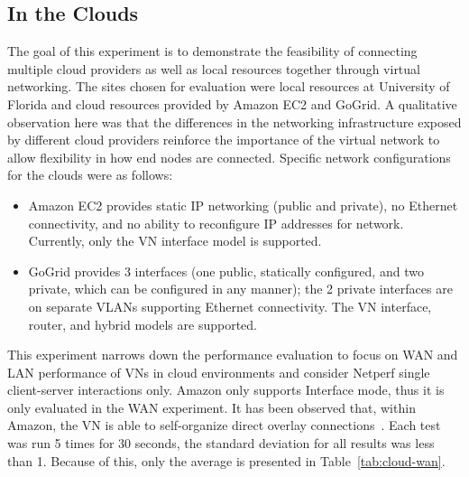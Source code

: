 \subsection{In the Clouds}

The goal of this experiment is to demonstrate the feasibility of connecting
multiple cloud providers as well as local resources together through virtual
networking.  The sites chosen for evaluation were local resources at University
of Florida and cloud resources provided by Amazon EC2 and GoGrid.  A
qualitative observation here was that the differences in the networking
infrastructure exposed by different cloud providers reinforce the importance of
the virtual network to allow flexibility in how end nodes are connected.
Specific network configurations for the clouds were as follows:

\begin{itemize}

\item Amazon EC2 provides static IP networking (public and private), no
Ethernet connectivity, and no ability to reconfigure IP addresses for network.
Currently, only the VN interface model is supported.

\item GoGrid provides 3 interfaces (one public, statically configured, and two
private, which can be configured in any manner); the 2 private interfaces are
on separate VLANs supporting Ethernet connectivity. The VN interface, router,
and hybrid models are supported.

\end{itemize}

This experiment narrows down the performance evaluation to focus on WAN and LAN
performance of VNs in cloud environments and consider Netperf single
client-server interactions only. Amazon only supports Interface mode, thus it
is only evaluated in the WAN experiment. It has been observed that, within
Amazon, the VN is able to self-organize direct overlay connections~\cite{wow}.
Each test was run 5 times for 30 seconds, the standard deviation for all
results was less than 1.  Because of this, only the average is presented in
Table~\ref{tab:cloud-wan}.

